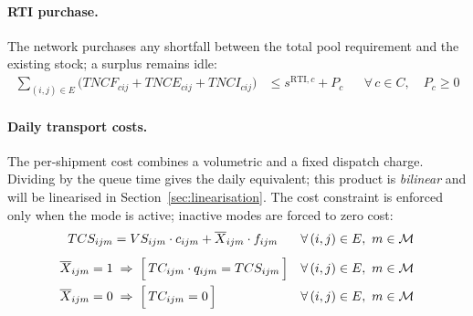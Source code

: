 
\paragraph{RTI purchase.}
The network purchases any shortfall between the total pool
requirement and the existing stock; a surplus remains idle:
%
\begin{align}
  \sum_{(i,j)\in E}\!\bigl(
    TNCF_{cij}+TNCE_{cij}+TNCI_{cij}
  \bigr)
  &\leq s^{\text{RTI},c} + P_{c}
  && \forall\, c\in C,\quad P_{c}\geq 0
  \label{eq:purchase}
\end{align}


\paragraph{Daily transport costs.}
The per-shipment cost combines a volumetric and a fixed dispatch
charge. Dividing by the queue time gives the daily equivalent;
this product is \emph{bilinear} and will be linearised in
Section~\ref{sec:linearisation}. The cost constraint is
enforced only when the mode is active; inactive modes are
forced to zero cost:
%
\begin{align}
  TCS_{ijm}
  &= VS_{ijm}\cdot c_{ijm}
     + \overline{X}_{ijm}\cdot f_{ijm}
  && \forall\,(i,j)\in E,\ m\in\mathcal{M}
  \label{eq:cost-ship}\\[4pt]
  \overline{X}_{ijm} = 1
    &\;\Rightarrow\;
    \Bigl[\,TC_{ijm}\cdot q_{ijm} = TCS_{ijm}\,\Bigr]
  && \forall\,(i,j)\in E,\ m\in\mathcal{M}
  \label{eq:cost-daily-on}\\
  \overline{X}_{ijm} = 0
    &\;\Rightarrow\;
    \Bigl[\,TC_{ijm} = 0\,\Bigr]
  && \forall\,(i,j)\in E,\ m\in\mathcal{M}
  \label{eq:cost-daily-off}
\end{align}
